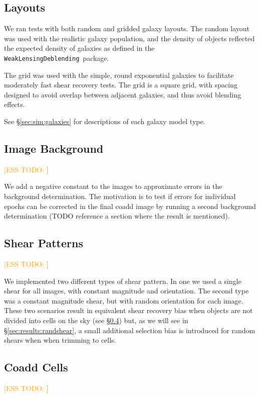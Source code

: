 \documentclass[iop, twocolappendix, appendixfloats, numberedappendix, apj]{hackemulateapj}
\newcommand{\esstodo}[1]{\textcolor{orange}{[ESS TODO: \bf #1]}}
\newcommand{\descwl}{\texttt{WeakLensingDeblending}}
\begin{document}
\subsection{Layouts} \label{sec:sim:layouts}

We ran tests with both random and gridded galaxy layouts.  The random layout
was used with the realistic galaxy population, and the density of objects
reflected the expected density of galaxies as defined in the \descwl\ package.

The grid was used with the simple, round exponential galaxies to facilitate
moderately fast shear recovery tests.  The grid is a square grid, with spacing
designed to avoid overlap between adjacent galaxies, and thus avoid blending
effects.

See \S \ref{sec:sim:galaxies} for descriptions of each galaxy model type.

\subsection{Image Background} \label{sec:sim:bgerr}
\esstodo{}

We add a negative constant to the images to approximate errors in the
background determination.  The motivation is to test if errors for individual
epochs can be corrected in the final coadd image by running a second background
determination (TODO reference a section where the result is mentioned).

\subsection{Shear Patterns} \label{sec:sim:shears}
\esstodo{}

We implemented two different types of shear pattern.  In one we used a single
shear for all images, with constant magnitude and orientation.  The second type
was a constant magnitude shear, but with random orientation for each image.
These two scenarios result in equivalent shear recovery bias when objects are
not divided into cells on the sky (see \S \ref{sec:sim:cells}) but, as we will
see in \S \ref{sec:results:randshear}, a small additional selection bias is
introduced for random shears when when trimming to cells.

\subsection{Coadd Cells} \label{sec:sim:cells}
\esstodo{}
\end{document}
